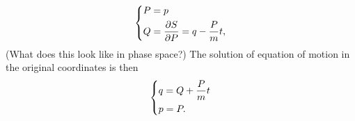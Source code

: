 \documentclass{article}
\begin{document}
    \begin{equation*}
        \begin{dcases}
            P = p \\
            Q = \pdv{S}{P} = q - \frac{P}{m}t,
        \end{dcases}
    \end{equation*}
    (What does this look like in phase space?) The solution of equation of motion in the original coordinates is then
    \begin{equation*}
    \begin{dcases*}
        q = Q + \frac{P}{m}t \\
        p = P.
    \end{dcases*}
    \end{equation*}

    
\end{document}
